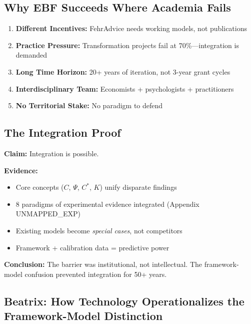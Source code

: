 \subsection{Why EBF Succeeds Where Academia Fails}

\begin{enumerate}
\item \textbf{Different Incentives:} FehrAdvice needs working models, not publications
\item \textbf{Practice Pressure:} Transformation projects fail at 70\%—integration is demanded
\item \textbf{Long Time Horizon:} 20+ years of iteration, not 3-year grant cycles
\item \textbf{Interdisciplinary Team:} Economists + psychologists + practitioners
\item \textbf{No Territorial Stake:} No paradigm to defend
\end{enumerate}

\subsection{The Integration Proof}

\begin{tcolorbox}[colback=green!5!white, colframe=green!75!black,
    title=Evidence-Based Framework: Existence Proof]
\textbf{Claim:} Integration is possible.

\textbf{Evidence:}
\begin{itemize}
\item Core concepts ($C$, $\Psi$, $C^*$, $K$) unify disparate findings
\item 8 paradigms of experimental evidence integrated (Appendix UNMAPPED_EXP)
\item Existing models become \textit{special cases}, not competitors
\item Framework + calibration data = predictive power
\end{itemize}

\textbf{Conclusion:} The barrier was institutional, not intellectual.
The framework-model confusion prevented integration for 50+ years.
\end{tcolorbox}


\subsection{Beatrix: How Technology Operationalizes the Framework-Model Distinction}
\label{sec:meta-beatrix}

